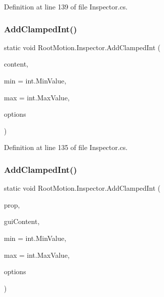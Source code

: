 Definition at line 139 of file Inspector.\+cs.

\mbox{\label{class_root_motion_1_1_inspector_a3446ec18e22ca9f9a24292f5800487c5}} 
\subsubsection{\texorpdfstring{Add\+Clamped\+Int()}{AddClampedInt()}\hspace{0.1cm}{\footnotesize\ttfamily [1/2]}}
{\footnotesize\ttfamily static void Root\+Motion.\+Inspector.\+Add\+Clamped\+Int (\begin{DoxyParamCaption}\item[{\mbox{\hyperlink{struct_root_motion_1_1_serialized_content}{Serialized\+Content}}}]{content,  }\item[{int}]{min = {\ttfamily int.MinValue},  }\item[{int}]{max = {\ttfamily int.MaxValue},  }\item[{params G\+U\+I\+Layout\+Option \mbox{[}$\,$\mbox{]}}]{options }\end{DoxyParamCaption})\hspace{0.3cm}{\ttfamily [static]}}



Definition at line 135 of file Inspector.\+cs.

\mbox{\label{class_root_motion_1_1_inspector_a61443f51860ed58be54639559912b50d}} 
\subsubsection{\texorpdfstring{Add\+Clamped\+Int()}{AddClampedInt()}\hspace{0.1cm}{\footnotesize\ttfamily [2/2]}}
{\footnotesize\ttfamily static void Root\+Motion.\+Inspector.\+Add\+Clamped\+Int (\begin{DoxyParamCaption}\item[{Serialized\+Property}]{prop,  }\item[{G\+U\+I\+Content}]{gui\+Content,  }\item[{int}]{min = {\ttfamily int.MinValue},  }\item[{int}]{max = {\ttfamily int.MaxValue},  }\item[{params G\+U\+I\+Layout\+Option \mbox{[}$\,$\mbox{]}}]{options }\end{DoxyParamCaption})\hspace{0.3cm}{\ttfamily [static]}}



